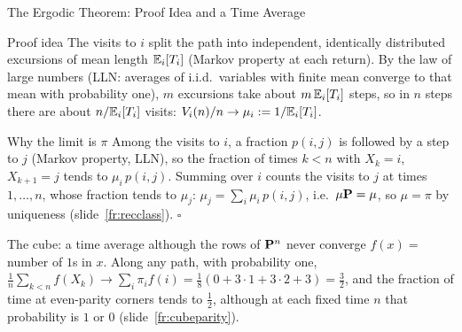 \begin{frame}{The Ergodic Theorem: Proof Idea and a Time Average}
  \label{fr:ergodicwhy}
  \small
  \begin{block}{Proof idea}
    The visits to $i$ split the path into independent, identically distributed excursions of mean length $\mathbb{E}_i[T_i]$ (Markov property at each return). By the law of large numbers (LLN: averages of i.i.d.\ variables with finite mean converge to that mean with probability one), $m$ excursions take about $m\,\mathbb{E}_i[T_i]$ steps, so in $n$ steps there are about $n/\mathbb{E}_i[T_i]$ visits: $V_i(n)/n\to\mu_i:=1/\mathbb{E}_i[T_i]$.
  \end{block}
  \begin{block}{Why the limit is $\pi$}
    Among the visits to $i$, a fraction $p(i,j)$ is followed by a step to $j$ (Markov property, LLN), so the fraction of times $k<n$ with $X_k=i$, $X_{k+1}=j$ tends to $\mu_i\,p(i,j)$. Summing over $i$ counts the visits to $j$ at times $1,\dots,n$, whose fraction tends to $\mu_j$: $\mu_j=\sum_i\mu_i\,p(i,j)$, i.e.\ $\mu\mathbf{P}=\mu$, so $\mu=\pi$ by uniqueness (slide~\ref{fr:recclass}). \hfill$\square$
  \end{block}
  \begin{exampleblock}{The cube: a time average although the rows of $\mathbf{P}^n$ never converge}
    $f(x)=$ number of $1$s in $x$. Along any path, with probability one, $\frac1n\sum_{k<n}f(X_k)\to\sum_i\pi_if(i)=\tfrac18(0+3\cdot1+3\cdot2+3)=\tfrac32$, and the fraction of time at even-parity corners tends to $\tfrac12$, although at each fixed time $n$ that probability is $1$ or $0$ (slide~\ref{fr:cubeparity}).
  \end{exampleblock}
\end{frame}


